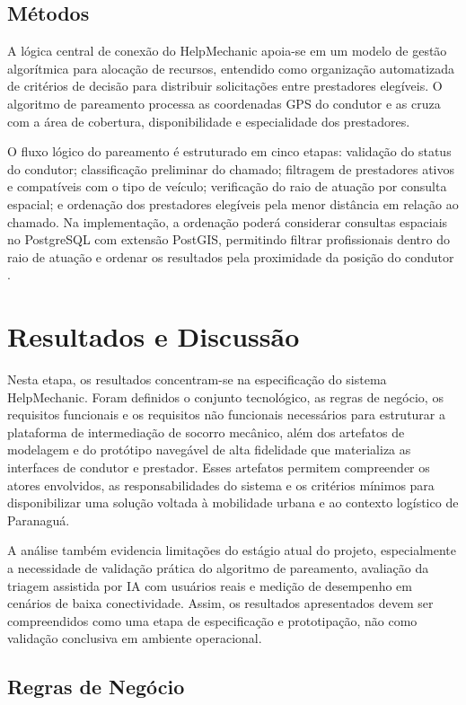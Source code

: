 \documentclass[12pt, a4paper]{article}
\begin{document}
\subsection{Métodos}
A lógica central de conexão do HelpMechanic apoia-se em um modelo de gestão algorítmica para alocação de recursos, entendido como organização automatizada de critérios de decisão para distribuir solicitações entre prestadores elegíveis. O algoritmo de pareamento processa as coordenadas GPS do condutor e as cruza com a área de cobertura, disponibilidade e especialidade dos prestadores.

O fluxo lógico do pareamento é estruturado em cinco etapas: validação do status do condutor; classificação preliminar do chamado; filtragem de prestadores ativos e compatíveis com o tipo de veículo; verificação do raio de atuação por consulta espacial; e ordenação dos prestadores elegíveis pela menor distância em relação ao chamado. Na implementação, a ordenação poderá considerar consultas espaciais no PostgreSQL com extensão PostGIS, permitindo filtrar profissionais dentro do raio de atuação e ordenar os resultados pela proximidade da posição do condutor \cite{postgis_sd}.

\section{Resultados e Discussão}
Nesta etapa, os resultados concentram-se na especificação do sistema HelpMechanic. Foram definidos o conjunto tecnológico, as regras de negócio, os requisitos funcionais e os requisitos não funcionais necessários para estruturar a plataforma de intermediação de socorro mecânico, além dos artefatos de modelagem e do protótipo navegável de alta fidelidade que materializa as interfaces de condutor e prestador. Esses artefatos permitem compreender os atores envolvidos, as responsabilidades do sistema e os critérios mínimos para disponibilizar uma solução voltada à mobilidade urbana e ao contexto logístico de Paranaguá.

A análise também evidencia limitações do estágio atual do projeto, especialmente a necessidade de validação prática do algoritmo de pareamento, avaliação da triagem assistida por IA com usuários reais e medição de desempenho em cenários de baixa conectividade. Assim, os resultados apresentados devem ser compreendidos como uma etapa de especificação e prototipação, não como validação conclusiva em ambiente operacional.

\subsection{Regras de Negócio}
\end{document}
